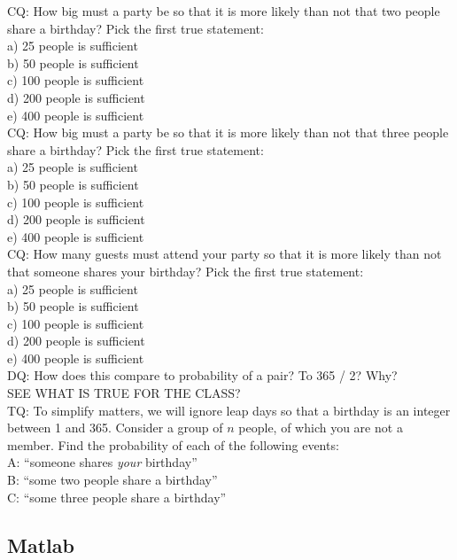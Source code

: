 \documentclass[12pt]{article}
\begin{document}
CQ: How big must a party be so that it is more likely than not that two people share a birthday? Pick the first true statement:\\
a) 25 people is sufficient \\
b) 50 people is sufficient \\
c) 100 people is sufficient \\
d) 200 people is sufficient \\
e) 400 people is sufficient \\

CQ: How big must a party be so that it is more likely than not that three people share a birthday? Pick the first true statement:\\
a) 25 people is sufficient \\
b) 50 people is sufficient \\
c) 100 people is sufficient \\
d) 200 people is sufficient \\
e) 400 people is sufficient \\

CQ: How many guests must attend your party so that it is more likely than not that someone shares your birthday? Pick the first true statement:\\
a) 25 people is sufficient \\
b) 50 people is sufficient \\
c) 100 people is sufficient \\
d) 200 people is sufficient \\
e) 400 people is sufficient \\

DQ: How does this compare to probability of a pair?  To 365 / 2?  Why? \\

SEE WHAT IS TRUE FOR THE CLASS? \\

TQ: To simplify matters, we will ignore leap days so that a birthday is an integer between 1 and 365.  Consider a group of $n$ people, of which you are not a member.  Find the probability of each of the following events: \\
A: ``someone shares {\em your} birthday'' \\
B: ``some two people share a birthday'' \\
C: ``some three people share a birthday'' \\

\subsection{Matlab}
\end{document}
